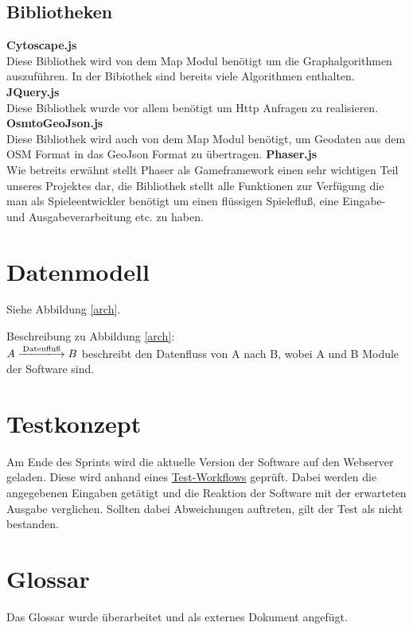 \documentclass[11pt,a4paper]{article}
\begin{document}
\subsection{Bibliotheken}
{\flushleft \textbf{Cytoscape.js}} \\
Diese Bibliothek wird von dem Map Modul benötigt um die Graphalgorithmen auszuführen. In der Bibiothek sind bereits viele Algorithmen enthalten.
{\flushleft \textbf{JQuery.js}} \\
Diese Bibliothek wurde vor allem benötigt um Http Anfragen zu realisieren.
{\flushleft \textbf{OsmtoGeoJson.js}} \\
Diese Bibliothek wird auch von dem Map Modul benötigt, um Geodaten aus dem OSM Format in das GeoJson Format zu übertragen. 
{\flushleft \textbf{Phaser.js}} \\
Wie betreits erwähnt stellt Phaser als Gameframework einen sehr wichtigen Teil unseres Projektes dar, die Bibliothek stellt alle Funktionen zur Verfügung die man als Spieleentwickler benötigt um einen flüssigen Spielefluß, eine Eingabe- und Ausgabeverarbeitung etc. 
zu haben. 
\section{Datenmodell}

Siehe Abbildung \ref{arch}.\bigskip

Beschreibung zu Abbildung \ref{arch}: \\
$A \xlongrightarrow{\text{Datenfluß}} B $ beschreibt den Datenfluss von A nach B, wobei A und B Module der Software sind.


\section{Testkonzept}
Am Ende des Sprints wird die aktuelle Version der Software auf den Webserver geladen. Diese wird anhand eines \href{https://github.com/GKP15/pucman/wiki/Test-workflow}{Test-Workflows} geprüft. Dabei werden die angegebenen Eingaben getätigt und die Reaktion der Software mit der erwarteten Ausgabe verglichen. Sollten dabei Abweichungen auftreten, gilt der Test als nicht bestanden.

\section{Glossar}
Das Glossar wurde überarbeitet und als externes Dokument angefügt.
\end{document}
